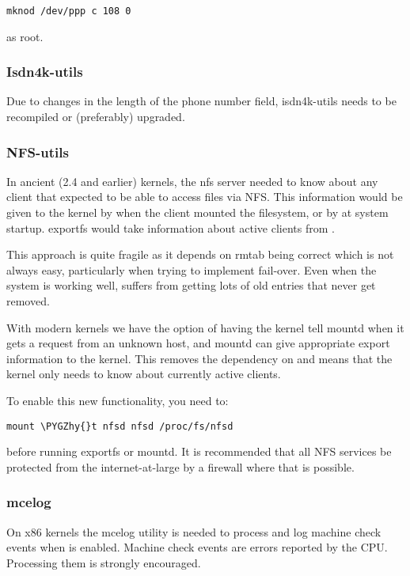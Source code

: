 \documentclass[a4paper,8pt,english]{sphinxmanual}
\def\PYGZhy{\char`\-}
\begin{document}
\begin{Verbatim}[commandchars=\\\{\}]
mknod /dev/ppp c 108 0
\end{Verbatim}

as root.


\subsubsection{Isdn4k-utils}
\label{process/changes:isdn4k-utils}
Due to changes in the length of the phone number field, isdn4k-utils
needs to be recompiled or (preferably) upgraded.


\subsubsection{NFS-utils}
\label{process/changes:nfs-utils}
In ancient (2.4 and earlier) kernels, the nfs server needed to know
about any client that expected to be able to access files via NFS.  This
information would be given to the kernel by  when the client
mounted the filesystem, or by  at system startup.  exportfs
would take information about active clients from .

This approach is quite fragile as it depends on rmtab being correct
which is not always easy, particularly when trying to implement
fail-over.  Even when the system is working well,  suffers from
getting lots of old entries that never get removed.

With modern kernels we have the option of having the kernel tell mountd
when it gets a request from an unknown host, and mountd can give
appropriate export information to the kernel.  This removes the
dependency on  and means that the kernel only needs to know about
currently active clients.

To enable this new functionality, you need to:

\begin{Verbatim}[commandchars=\\\{\}]
mount \PYGZhy{}t nfsd nfsd /proc/fs/nfsd
\end{Verbatim}

before running exportfs or mountd.  It is recommended that all NFS
services be protected from the internet-at-large by a firewall where
that is possible.


\subsubsection{mcelog}
\label{process/changes:mcelog}
On x86 kernels the mcelog utility is needed to process and log machine check
events when  is enabled. Machine check events are errors
reported by the CPU. Processing them is strongly encouraged.
\end{document}
